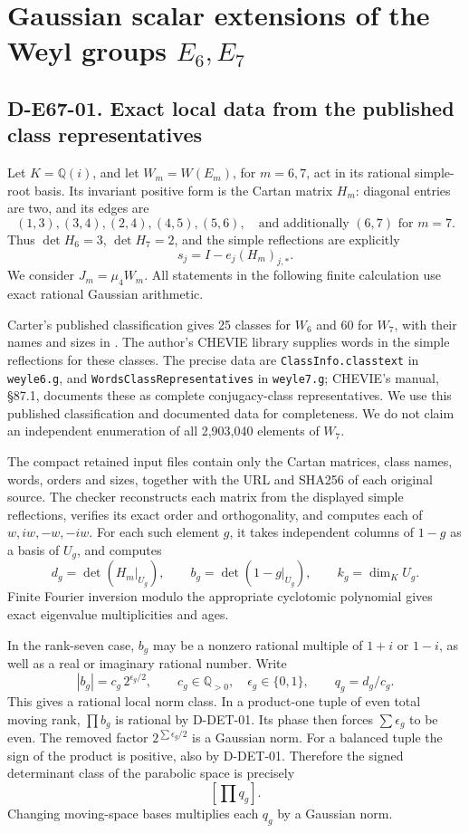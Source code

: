 \section{Gaussian scalar extensions of the Weyl groups \(E_6,E_7\)}
\label{sec:e6-e7-gaussian}

\subsection*{D-E67-01. Exact local data from the published class representatives}

Let \(K=\mathbb Q(i)\), and let \(W_m=W(E_m)\), for \(m=6,7\),
act in its rational simple-root basis. Its invariant positive form is
the Cartan matrix \(H_m\): diagonal entries are two, and its edges
are
\[
 (1,3),(3,4),(2,4),(4,5),(5,6),
 \quad\text{and additionally }(6,7)\text{ for }m=7.
\]
Thus \(\det H_6=3\), \(\det H_7=2\), and the simple reflections
are explicitly
\[
                   s_j=I-e_j(H_m)_{j,*}.
\]
We consider \(J_m=\mu_4W_m\). All statements in the following finite
calculation use exact rational Gaussian arithmetic.

Carter's published classification gives 25 classes for \(W_6\) and
60 for \(W_7\), with their names and sizes in
\cite[Table 9, p.~50; Table 10, pp.~51--52]{WG:Carter}.
The author's CHEVIE library supplies words in the simple reflections for
these classes. The precise data are \texttt{ClassInfo.classtext} in
\texttt{weyle6.g}, and \texttt{WordsClassRepresentatives} in
\texttt{weyle7.g}; CHEVIE's manual, \S87.1, documents these as
complete conjugacy-class representatives. We use this published
classification and documented data for completeness. We do not claim
an independent enumeration of all 2,903,040 elements of \(W_7\).

The compact retained input files contain only the Cartan matrices, class
names, words, orders and sizes, together with the URL and SHA256 of each
original source. The checker reconstructs each matrix from the displayed
simple reflections, verifies its exact order and orthogonality, and
computes each of \(w,iw,-w,-iw\). For each such element \(g\), it
takes independent columns of \(1-g\) as a basis of \(U_g\), and
computes
\[
       d_g=\det(H_m|_{U_g}),\qquad
       b_g=\det(1-g|_{U_g}),\qquad k_g=\dim_K U_g.
\]
Finite Fourier inversion modulo the appropriate cyclotomic polynomial
gives exact eigenvalue multiplicities and ages.

In the rank-seven case, \(b_g\) may be a nonzero rational multiple
of \(1+i\) or \(1-i\), as well as a real or imaginary rational
number. Write
\[
              |b_g|=c_g\,2^{\epsilon_g/2},
           \qquad c_g\in\mathbb Q_{>0},\quad\epsilon_g\in\{0,1\},
           \qquad q_g=d_g/c_g.
\]
This gives a rational local norm class. In a product-one tuple of even
total moving rank, \(\prod b_g\) is rational by D-DET-01. Its phase
then forces \(\sum\epsilon_g\) to be even. The removed factor
\(2^{\sum\epsilon_g/2}\) is a Gaussian norm. For a balanced tuple
the sign of the product is positive, also by D-DET-01. Therefore the
signed determinant class of the parabolic space is precisely
\[
                              \left[\prod q_g\right].
\]
Changing moving-space bases multiplies each \(q_g\) by a Gaussian norm.

